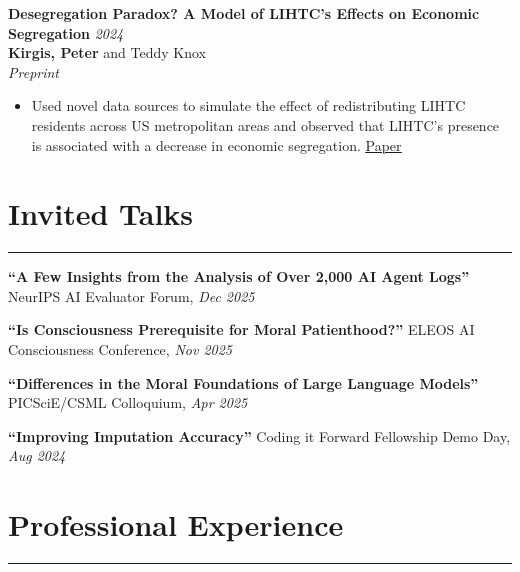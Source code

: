 \documentclass[11pt]{article}
\begin{document}
\vspace{1em}

\textbf{Desegregation Paradox? A Model of LIHTC's Effects on Economic Segregation} \hfill \textit{2024}\\
\textbf{Kirgis, Peter} and Teddy Knox\\
\textit{Preprint}
\begin{itemize}
    \item Used novel data sources to simulate the effect of redistributing LIHTC residents across US metropolitan areas and observed that LIHTC's presence is associated with a decrease in economic segregation.
    \hfill \href{https://peterkirgis.github.io/files/LIHTC.pdf}{\underline{Paper}}
\end{itemize}

\vspace{1em}

\section*{Invited Talks}
\hrule
\vspace{1em}

\textbf{``A Few Insights from the Analysis of Over 2,000 AI Agent Logs''} \hfill NeurIPS AI Evaluator Forum, \textit{Dec 2025}

\vspace{0.5em}
\textbf{``Is Consciousness Prerequisite for Moral Patienthood?''} \hfill ELEOS AI Consciousness Conference, \textit{Nov 2025}

\vspace{0.5em}
\textbf{``Differences in the Moral Foundations of Large Language Models''} \hfill PICSciE/CSML Colloquium, \textit{Apr 2025}

\vspace{0.5em}
\textbf{``Improving Imputation Accuracy''} \hfill Coding it Forward Fellowship Demo Day, \textit{Aug 2024}

\vspace{1em}

\section*{Professional Experience}
\hrule
\vspace{1em}
\end{document}
